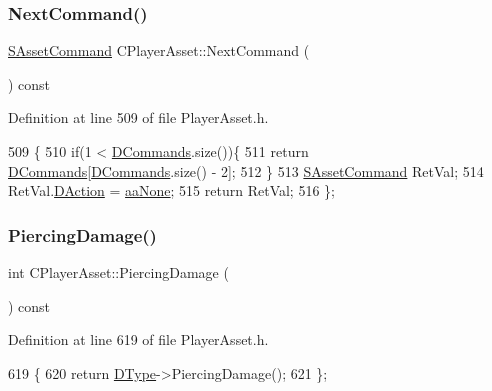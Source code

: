 \subsubsection{\texorpdfstring{Next\+Command()}{NextCommand()}}
{\footnotesize\ttfamily \hyperlink{structSAssetCommand}{S\+Asset\+Command} C\+Player\+Asset\+::\+Next\+Command (\begin{DoxyParamCaption}{ }\end{DoxyParamCaption}) const\hspace{0.3cm}{\ttfamily [inline]}}



Definition at line 509 of file Player\+Asset.\+h.


\begin{DoxyCode}
509                                          \{
510             \textcolor{keywordflow}{if}(1 < \hyperlink{classCPlayerAsset_a4d3b96106d3b1c1020f98005884d2a87}{DCommands}.size())\{
511                 \textcolor{keywordflow}{return} \hyperlink{classCPlayerAsset_a4d3b96106d3b1c1020f98005884d2a87}{DCommands}[\hyperlink{classCPlayerAsset_a4d3b96106d3b1c1020f98005884d2a87}{DCommands}.size() - 2];
512             \}
513             \hyperlink{structSAssetCommand}{SAssetCommand} RetVal;
514             RetVal.\hyperlink{structSAssetCommand_a8edd3b3d59a76d5514ba403bc8076a75}{DAction} = \hyperlink{GameDataTypes_8h_ab47668e651a3032cfb9c40ea2d60d670ac17cc5a0035320c060d7f8074143b507}{aaNone};
515             \textcolor{keywordflow}{return} RetVal;
516         \};
\end{DoxyCode}
\hypertarget{classCPlayerAsset_a1949069b1bec611fdfa74488a3d6864f}{}\label{classCPlayerAsset_a1949069b1bec611fdfa74488a3d6864f} 
\subsubsection{\texorpdfstring{Piercing\+Damage()}{PiercingDamage()}}
{\footnotesize\ttfamily int C\+Player\+Asset\+::\+Piercing\+Damage (\begin{DoxyParamCaption}{ }\end{DoxyParamCaption}) const\hspace{0.3cm}{\ttfamily [inline]}}



Definition at line 619 of file Player\+Asset.\+h.


\begin{DoxyCode}
619                                   \{
620             \textcolor{keywordflow}{return} \hyperlink{classCPlayerAsset_a5d61f73471e1e6f0a6ab15f2ffa7b359}{DType}->PiercingDamage(); 
621         \};
\end{DoxyCode}
\hypertarget{classCPlayerAsset_af7403a6a0eab4eaedd2b04d66e21d601}{}\label{classCPlayerAsset_af7403a6a0eab4eaedd2b04d66e21d601} 
